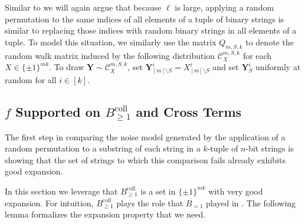 Similar to  we will again argue that because $\ell$ is large, applying a random permutation to the same indices of all elements of a tuple of binary strings is similar to replacing those indices with random binary strings in all elements of a tuple. To model this situation, we similarly use the matrix $Q_{m,S,k}$ to denote the random walk matrix induced by the following distribution $\mathcal{C}_X^{m,S,k}$ for each $X\in\{\pm1\}^{mk}$. To draw $\mathbf{Y}\sim\mathcal{C}_X^{m,S,k}$, set $\mathbf{Y}^i_{[m]\setminus S}=X^i_{[m]\setminus S}$ and set $\mathbf{Y}^i_S$ uniformly at random for all $i\in[k]$.

\subsection{$f$ Supported on $B_{\geq 1}^{\mathrm{coll}}$ and Cross Terms}\label{sec:coll and cross terms}

The first step in comparing the noise model generated by the application of a random permutation to a substring of each string in a $k$-tuple of $n$-bit strings is showing that the set of strings to which this comparison fails already exhibits good expansion.

In this section we leverage that $B_{\geq1}^{\mathrm{coll}}$ is a set in $\{\pm1\}^{mk}$ with very good expansion. For intuition, $B_{\geq1}^{\mathrm{coll}}$ plays the role that $B_{=1}$ played in . The following lemma formalizes the expansion property that we need.

